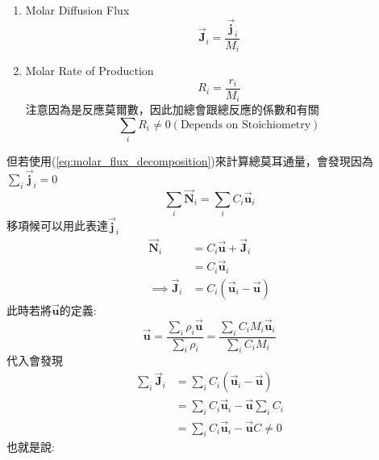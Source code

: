 \documentclass[../main.tex]{subfiles}
\begin{document}
\begin{itemize}
\begin{enumerate}
\begin{enumerate}
        \begin{equation}
          \boxed{C_i = \frac{\rho_i}{M_i}}  \label{eq:species_molar_concentration}
        \end{equation}
        \item Molar Diffusion Flux
        \begin{equation}
          \boxed{\vec{\bm J}_i = \frac{\vec{\bm j}_i}{M_i}}
        \end{equation}
        \item Molar Rate of Production
        \begin{equation}
          \boxed{R_i = \frac{r_i}{M_i}} \label{eq:molar_rate_of_production}
        \end{equation}
        注意因為是反應莫爾數，因此加總會跟總反應的係數和有關
        \begin{equation}
          \sum_i R_i \neq 0 (\text{Depends on Stoichiometry})
        \end{equation}
      \end{enumerate}
      但若使用(\ref{eq:molar_flux_decomposition})來計算總莫耳通量，會發現因為$\sum_i \vec{\bm j}_i = 0$
      \begin{equation}
        \sum_i \vec{\bm N}_i = \sum_i C_i \vec{\bm u}_i \label{eq:species_molar_flux_alternate}
      \end{equation}
      移項候可以用此表達$\vec{\bm j}_i$
      \begin{align}
        \vec{\bm N}_i &= C_i \vec{\bm u} + \vec{\bm J}_i \nonumber\\
        &= C_i \vec{\bm u}_i \nonumber\\
        \implies \vec{\bm J}_i &= C_i (\vec{\bm u}_i - \vec{\bm u})
      \end{align}
      此時若將$\vec{\bm u}$的定義:
      \begin{equation}
        \vec{\bm u} = \frac{\sum_i \rho_i \vec{\bm u}}{\sum_i \rho_i} = \frac{\sum_i C_i M_i \vec{\bm u}_i}{\sum_i C_i M_i}
      \end{equation}
      代入會發現
      \begin{align}
        \sum_i \vec{\bm J}_i &= \sum_i C_i (\vec{\bm u}_i - \vec{\bm u}) \nonumber\\
        &= \sum_i C_i \vec{\bm u}_i - \vec{\bm u} \sum_i C_i \nonumber\\
        &= \sum_i C_i \vec{\bm u}_i - \vec{\bm u} C \neq 0
      \end{align}
      也就是說:
      \begin{equation}

\end{equation}
\end{enumerate}
\end{itemize}
\end{document}
